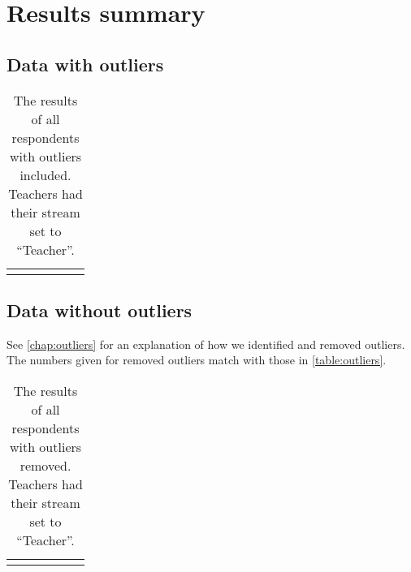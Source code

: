 \chapter{Results summary}
\section{Data with outliers}
\begin{longtable}{rrrlll}
	\caption{The results of all respondents with outliers included. Teachers had their stream set to ``Teacher''.}\\
	\label{table:outliers}
	
\end{longtable}

\section{Data without outliers}
See \vref{chap:outliers} for an explanation of how we identified and removed outliers.
The numbers given for removed outliers match with those in \vref{table:outliers}.
\begin{longtable}{rrrlll}
	\caption{The results of all respondents with outliers removed. Teachers had their stream set to ``Teacher''.}\\
	\label{table:noOutliers}
	
\end{longtable}

